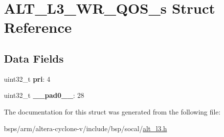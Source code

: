 \hypertarget{structALT__L3__WR__QOS__s}{}\section{A\+L\+T\+\_\+\+L3\+\_\+\+W\+R\+\_\+\+Q\+O\+S\+\_\+s Struct Reference}
\label{structALT__L3__WR__QOS__s}
\subsection*{Data Fields}
\begin{DoxyCompactItemize}
\item 
\mbox{\label{structALT__L3__WR__QOS__s_a39ae2f75902cc2064015aa14c660c293}} 
uint32\+\_\+t {\bfseries pri}\+: 4
\item 
\mbox{\label{structALT__L3__WR__QOS__s_ab9b95167de87754f95b9c0cc8d371d12}} 
uint32\+\_\+t {\bfseries \+\_\+\+\_\+pad0\+\_\+\+\_\+}\+: 28
\end{DoxyCompactItemize}


The documentation for this struct was generated from the following file\+:\begin{DoxyCompactItemize}
\item 
bsps/arm/altera-\/cyclone-\/v/include/bsp/socal/\mbox{\hyperlink{alt__l3_8h}{alt\+\_\+l3.\+h}}\end{DoxyCompactItemize}
